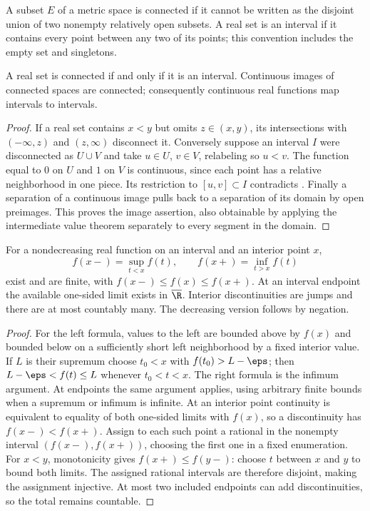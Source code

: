 \begin{definition}
A subset $E$ of a metric space is connected if it cannot be written as the disjoint union of two nonempty relatively open subsets. A real set is an interval if it contains every point between any two of its points; this convention includes the empty set and singletons.
\end{definition}
\begin{theorem}
A real set is connected if and only if it is an interval. Continuous images of connected spaces are connected; consequently continuous real functions map intervals to intervals.
\end{theorem}
\begin{proof}
If a real set contains $x<y$ but omits $z\in(x,y)$, its intersections with $(-\infty,z)$ and $(z,\infty)$ disconnect it. Conversely suppose an interval $I$ were disconnected as $U\cup V$ and take $u\in U$, $v\in V$, relabeling so $u<v$. The function equal to $0$ on $U$ and $1$ on $V$ is continuous, since each point has a relative neighborhood in one piece. Its restriction to $[u,v]\subset I$ contradicts . Finally a separation of a continuous image pulls back to a separation of its domain by open preimages. This proves the image assertion, also obtainable by applying the intermediate value theorem separately to every segment in the domain.
\end{proof}

\begin{theorem}
For a nondecreasing real function on an interval and an interior point $x$,
\[ f(x-)=\sup_{t<x}f(t),\qquad f(x+)=\inf_{t>x}f(t) \]
exist and are finite, with $f(x-)\le f(x)\le f(x+)$. At an interval endpoint the available one-sided limit exists in $\overline\R$. Interior discontinuities are jumps and there are at most countably many. The decreasing version follows by negation.
\end{theorem}
\begin{proof}
For the left formula, values to the left are bounded above by $f(x)$ and bounded below on a sufficiently short left neighborhood by a fixed interior value. If $L$ is their supremum choose $t_0<x$ with $f(t_0)>L-\eps$; then $L-\eps<f(t)\le L$ whenever $t_0<t<x$. The right formula is the infimum argument. At endpoints the same argument applies, using arbitrary finite bounds when a supremum or infimum is infinite. At an interior point continuity is equivalent to equality of both one-sided limits with $f(x)$, so a discontinuity has $f(x-)<f(x+)$. Assign to each such point a rational in the nonempty interval $(f(x-),f(x+))$, choosing the first one in a fixed enumeration. For $x<y$, monotonicity gives $f(x+)\le f(y-)$: choose $t$ between $x$ and $y$ to bound both limits. The assigned rational intervals are therefore disjoint, making the assignment injective. At most two included endpoints can add discontinuities, so the total remains countable.
\end{proof}


